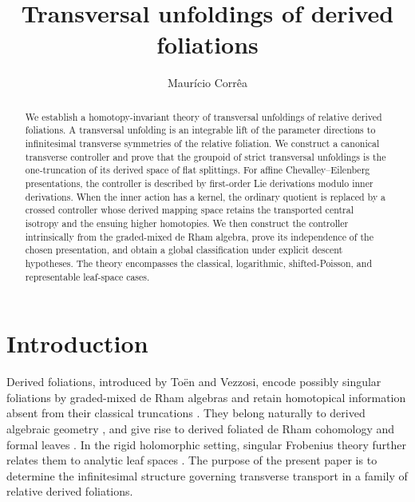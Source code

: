 \documentclass[11pt,reqno,a4paper,dvipsnames,x11names]{amsart}
\title[Transversal unfoldings of derived foliations]{Transversal unfoldings of derived foliations}
\author{}
\date{}
\numberwithin{equation}{section}
\theoremstyle{plain}
\theoremstyle{definition}
\theoremstyle{remark}
\begin{document}
\begin{abstract}
We establish a homotopy-invariant theory of transversal unfoldings of relative derived foliations. A transversal unfolding is an integrable lift of the parameter directions to infinitesimal transverse symmetries of the relative foliation. We construct a canonical transverse controller and prove that the groupoid of strict transversal unfoldings is the one-truncation of its derived space of flat splittings. For affine Chevalley--Eilenberg presentations, the controller is described by first-order Lie derivations modulo inner derivations. When the inner action has a kernel, the ordinary quotient is replaced by a crossed controller whose derived mapping space retains the transported central isotropy and the ensuing higher homotopies. We then construct the controller intrinsically from the graded-mixed de Rham algebra, prove its independence of the chosen presentation, and obtain a global classification under explicit descent hypotheses. The theory encompasses the classical, logarithmic, shifted-Poisson, and representable leaf-space cases.
\end{abstract}
\author[M. Corr\^ea]{Maur\'icio Corr\^ea}
\address[M. Corr\^ea]{Dipartimento di Matematica, Universit\`a degli Studi di Bari, Via E. Orabona 4, I-70125, Bari, Italy}

\maketitle
 

\section{Introduction}

Derived foliations, introduced by To\"en and Vezzosi, encode possibly singular foliations by graded-mixed de Rham algebras and retain homotopical information absent from their classical truncations \cite{TV}. They belong naturally to derived algebraic geometry \cite{HAGII,PTVV,CPTVV}, and give rise to derived foliated de Rham cohomology and formal leaves \cite[Sections~2.3 and~3.2--3.3]{TV}. In the rigid holomorphic setting, singular Frobenius theory further relates them to analytic leaf spaces \cite{Malgrange76,Malgrange77,TVRH}. The purpose of the present paper is to determine the infinitesimal structure governing transverse transport in a family of relative derived foliations.
\end{document}
